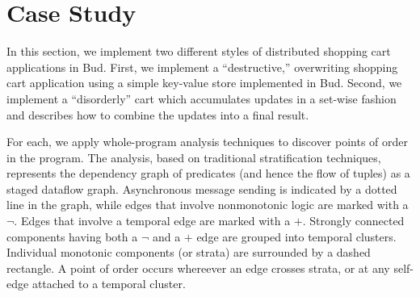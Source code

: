 \section{Case Study}
\label{sec:case}





In this section, we implement two different styles of distributed shopping cart
applications in Bud.  First, we implement a ``destructive,'' overwriting
shopping cart application using a simple key-value store implemented in Bud.
Second, we implement a ``disorderly'' cart which accumulates updates in a 
set-wise fashion and describes how to combine the updates into a final result.

For each, we apply whole-program analysis techniques to discover points of 
order in the program.  The analysis, based on traditional stratification
techniques, represents the dependency graph of predicates (and hence the 
flow of tuples) as a staged dataflow graph.  Asynchronous message sending
is indicated by a dotted line in the graph, while edges that involve 
nonmonotonic logic are marked with a $\lnot$.  Edges that involve a temporal 
edge are marked with a $+$.  Strongly connected components having both a $\lnot$ and a $+$ edge are grouped into temporal clusters.  Individual monotonic components 
(or strata) are surrounded by a dashed rectangle.  A point of order occurs
whereever an edge crosses strata, or at any self-edge attached to a temporal cluster.

